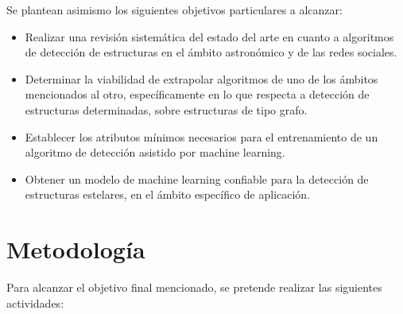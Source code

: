\documentclass[
	11pt,oneside,a4paper,
	headsepline,footsepline,
	fleqn,
]{memoir}
\begin{document}

Se plantean asimismo los siguientes objetivos particulares a alcanzar:

\begin{itemize}
	\item Realizar una revisión sistemática del estado del arte en cuanto a algoritmos de detección de estructuras en el ámbito astronómico y de las redes sociales.
	\item Determinar la viabilidad de extrapolar algoritmos de uno de los ámbitos mencionados al otro, específicamente en lo que respecta a detección de estructuras determinadas, sobre estructuras de tipo grafo.
	\item Establecer los atributos mínimos necesarios para el entrenamiento de un algoritmo de detección asistido por machine learning.
	\item Obtener un modelo de machine learning confiable para la detección de estructuras estelares, en el ámbito específico de aplicación.
\end{itemize}

\section {Metodología}

Para alcanzar el objetivo final mencionado, se pretende realizar las siguientes actividades:
\end{document}
